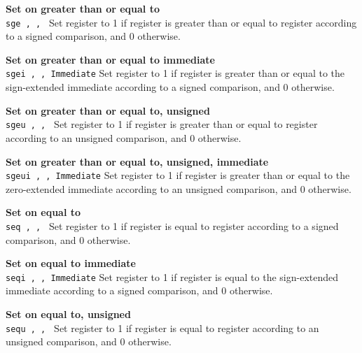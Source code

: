 \noindent
{\bf Set on greater than or equal to}\\
\noindent
\texttt{sge \regd, \regs, \regt}
Set register \regd{} to 1 if register \regs{} is
greater than or equal to register \regt{} according to a signed comparison, and 0 otherwise.
\vspace{3ex}

\noindent
{\bf Set on greater than or equal to immediate}\\
\noindent
\texttt{sgei \regd, \regs, Immediate}
Set register \regd{} to 1 if register \regs{} is
greater than or equal to the sign-extended immediate according to a signed comparison, and 0 otherwise.
\vspace{3ex}

\noindent
{\bf Set on greater than or equal to, unsigned}\\
\noindent
\texttt{sgeu \regd, \regs, \regt}
Set register \regd{} to 1 if register \regs{} is
greater than or equal to register \regt{} according to an unsigned comparison, and 0 otherwise.
\vspace{3ex}

\noindent
{\bf Set on greater than or equal to, unsigned, immediate}\\
\noindent
\texttt{sgeui \regd, \regs, Immediate}
Set register \regd{} to 1 if register \regs{} is
greater than or equal to the zero-extended immediate according to an unsigned comparison, and 0 otherwise.
\vspace{3ex}

\noindent
{\bf Set on equal to}\\
\noindent
\texttt{seq \regd, \regs, \regt}
Set register \regd{} to 1 if register \regs{} is
equal to register \regt{} according to a signed comparison, and 0 otherwise.
\vspace{3ex}
\newpage

\noindent
{\bf Set on equal to immediate}\\
\noindent
\texttt{seqi \regd, \regs, Immediate}
Set register \regd{} to 1 if register \regs{} is
equal to the sign-extended immediate according to a signed comparison, and 0 otherwise.
\vspace{3ex}

\noindent
{\bf Set on equal to, unsigned}\\
\noindent
\texttt{sequ \regd, \regs, \regt}
Set register \regd{} to 1 if register \regs{} is
equal to register \regt{} according to an unsigned comparison, and 0 otherwise.
\vspace{3ex}

